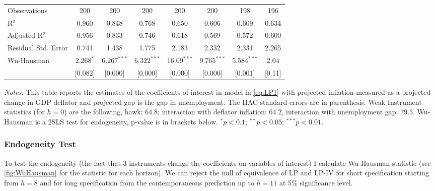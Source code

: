 \documentclass[11pt]{article}
\begin{document}
\begin{table}[!htbp]
\begin{threeparttable}
\begin{tabular}{@{\extracolsep{5pt}}lccccccc}
      Observations & 200 & 200 & 200 & 200 & 200 & 198 & 196 \\ 
      R$^{2}$ & 0.960 & 0.848 & 0.768 & 0.650 & 0.606 & 0.609 & 0.634 \\ 
      Adjusted R$^{2}$ & 0.956 & 0.833 & 0.746 & 0.618 & 0.569 & 0.572 & 0.600 \\ 
      Residual Std. Error & 0.741 & 1.438 & 1.775 & 2.183 & 2.332 & 2.331 & 2.265 \\ 
      Wu-Hausman & $2.268^{*}$& $6.267^{***}$ & $6.322^{***}$ & $16.09^{***}$ & $9.765^{***}$ & $5.584^{***}$ & $2.04$\\
       &[0.082]& [0.000] & [0.000]& [0.000] & [0.000] & [0.001]& [0.11]\\
      \hline 
      \hline
    \end{tabular} 
    \begin{tablenotes}[flushleft]\scriptsize
      \item[] \textit{Notes:} 
      This table reports the estimates of the coefficients of interest in model in \vref{eq:LP1} with projected inflation measured as a projected change in GDP deflator and projected gap is the gap in unemployment. The \citet{Andrews1991} HAC standard errors  are in parenthesis. Weak Instrument statistics (for $h=0$) are the following, hawk: $64.8$; interaction with deflator inflation: $64.2$, interaction with unemployment gap: $79.5$. Wu-Hausman is a 2SLS test for endogeneity, p-value is in brackets below. $^{*}p<0.1$; $^{**}p<0.05$; $^{***}p<0.01$.
    \end{tablenotes}
  \end{threeparttable}
  \end{table} 
  



\subsubsection{Endogeneity Test}

To test the endogeneity (the fact that 3 instruments change the coefficients on variables of interest) I calculate Wu-Hausman statistic (see \vref{fig:WuHausman} for the statistic for each horizon). 
We can reject the null of equivalence of LP and LP-IV for short specification starting from $h=8$ and for long specification from the contemporaneous prediction up to $h=11$ at 5\% significance level.
\end{document}
